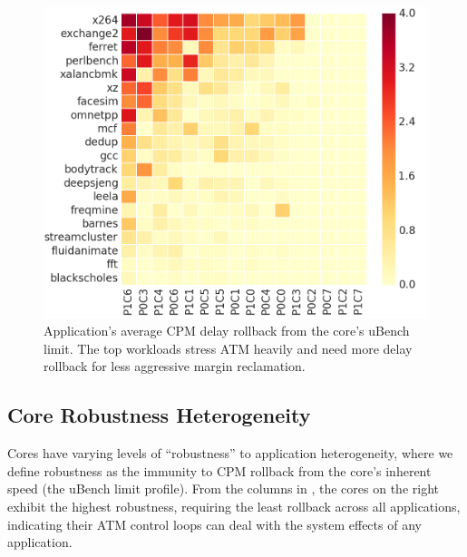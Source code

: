 \begin{figure}[tb!]
  \centering
  \includegraphics[trim=0 0 0 0,clip,width=\linewidth]{graphs/process//spec-limit-dist/app-rollback.png}
  \caption{Application's average CPM delay rollback from the core's uBench limit. The top workloads stress ATM heavily and need more delay rollback for less aggressive margin reclamation.}
  \label{fig:app-cpm-heatmap}
\end{figure}



\subsection{Core Robustness Heterogeneity}
\label{sec:process:workload:robustness}


Cores have varying levels of ``robustness'' to application heterogeneity, where we define robustness as the immunity to CPM rollback from the core's inherent speed (the uBench limit profile). From the columns in , the cores on the right exhibit the highest robustness, requiring the least rollback across all applications, indicating their ATM control loops can deal with the system effects of any application.

